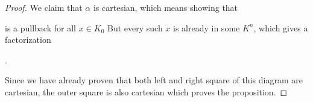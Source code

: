\begin{lemma}
\begin{proof}
        We claim that $\alpha$ is cartesian, which means showing that
        \begin{center}
        \end{center}
        is a pullback for all $x\in K_0$
        But every such $x$ is already in some $K^n$, which gives a factorization
        \begin{center}
            \;.
        \end{center}
        Since we have already proven that both left and right square of this diagram are cartesian, the outer square is also cartesian which proves the proposition.
    \end{proof}
\end{lemma}